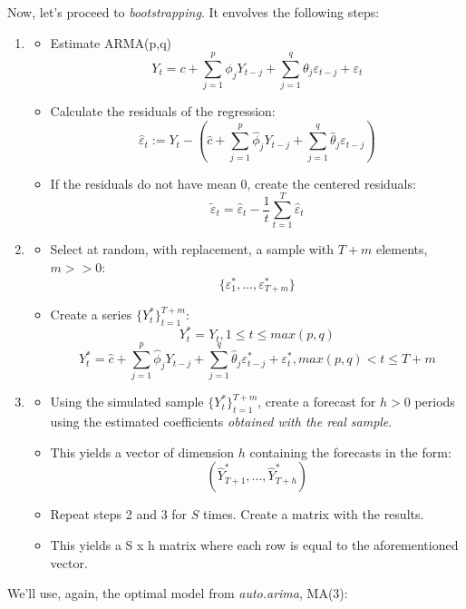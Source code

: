 \documentclass[11pt, a4paper]{report}
\theoremstyle{plain}
\theoremstyle{plain}
\theoremstyle{remark}
\begin{document}
Now, let's proceed to \emph{bootstrapping}. It envolves the following
steps:

\begin{enumerate}
	\item \begin{itemize}
		\item Estimate ARMA(p,q)
		$$ Y_t = c + \sum_{j=1}^p \phi_j Y_{t-j} + \sum_{j=1}^q \theta_j \varepsilon_{t-j} + \varepsilon_t$$
		
		\item Calculate the residuals of the regression:
		$$ \hat{\varepsilon}_t := Y_t - (\hat{c} + \sum_{j=1}^p \hat{\phi}_j Y_{t-j} + \sum_{j=1}^q \hat{\theta}_j \varepsilon_{t-j})$$
		
		\item If the residuals do not have mean 0, create the centered residuals:
		$$ \tilde{\varepsilon}_t = \hat{\varepsilon}_t - \frac{1}{t} \sum_{t=1}^T \hat{\varepsilon}_t$$
	\end{itemize}
	
	\item \begin{itemize}
		\item Select at random, with replacement, a sample with $T + m$ elements, $m >> 0$:
		$$\{\varepsilon^*_1, ..., \varepsilon^*_{T+m}\}$$
		\item Create a series $\{Y^*_t\}_{t=1}^{T+m}$:
		$$ Y_t^* = Y_t, 1 \leq t \leq max(p,q) $$
		$$ Y_t^* = \hat{c} + \sum_{j=1}^p \hat{\phi}_j Y_{t-j} + \sum_{j=1}^q \hat{\theta}_j \varepsilon_{t-j}^* + \varepsilon_t^*, max(p,q) < t \leq T + m $$
	\end{itemize}
	\item \begin{itemize}
		\item Using the simulated sample $\{Y^*_t\}_{t=1}^{T+m}$, create a forecast for $h >0$ periods using the estimated coefficients \textit{obtained with the real sample}.
		\item This yields a vector of dimension $h$ containing the forecasts in the form:
		$$(\hat{Y}^*_{T+1}, ..., \hat{Y}^*_{T+h})$$ 
		\item Repeat steps 2 and 3 for $S$ times. Create a matrix with the results.
		\item This yields a S x h matrix where each row is equal to the aforementioned vector.
	\end{itemize}
\end{enumerate}

We'll use, again, the optimal model from \emph{auto.arima}, MA(3):
\end{document}
